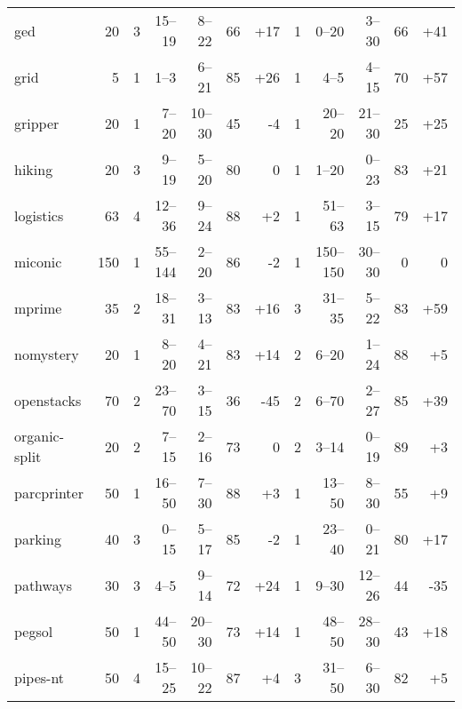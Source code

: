 \documentclass{article}
\begin{document}
\begin{table}
\begin{tabular}{l@{}rr|rrrr|r|rrrr}
           ged &     20 &   3 &   15--19 &   8--22 &  66 &  {\color{blue}+17} &   1 &     0--20 &   3--30 &  66 &  {\color{blue}+41} \\
          grid &      5 &   1 &     1--3 &   6--21 &  85 &  {\color{blue}+26} &   1 &      4--5 &   4--15 &  70 &  {\color{blue}+57} \\
       gripper &     20 &   1 &    7--20 &  10--30 &  45 &    {\color{red}-4} &   1 &    20--20 &  21--30 &  25 &  {\color{blue}+25} \\
        hiking &     20 &   3 &    9--19 &   5--20 &  80 &                  0 &   1 &     1--20 &   0--23 &  83 &  {\color{blue}+21} \\
     logistics &     63 &   4 &   12--36 &   9--24 &  88 &   {\color{blue}+2} &   1 &    51--63 &   3--15 &  79 &  {\color{blue}+17} \\
       miconic &    150 &   1 &  55--144 &   2--20 &  86 &    {\color{red}-2} &   1 &  150--150 &  30--30 &   0 &                  0 \\
        mprime &     35 &   2 &   18--31 &   3--13 &  83 &  {\color{blue}+16} &   3 &    31--35 &   5--22 &  83 &  {\color{blue}+59} \\
     nomystery &     20 &   1 &    8--20 &   4--21 &  83 &  {\color{blue}+14} &   2 &     6--20 &   1--24 &  88 &   {\color{blue}+5} \\
    openstacks &     70 &   2 &   23--70 &   3--15 &  36 &   {\color{red}-45} &   2 &     6--70 &   2--27 &  85 &  {\color{blue}+39} \\
 organic-split &     20 &   2 &    7--15 &   2--16 &  73 &                  0 &   2 &     3--14 &   0--19 &  89 &   {\color{blue}+3} \\
   parcprinter &     50 &   1 &   16--50 &   7--30 &  88 &   {\color{blue}+3} &   1 &    13--50 &   8--30 &  55 &   {\color{blue}+9} \\
       parking &     40 &   3 &    0--15 &   5--17 &  85 &    {\color{red}-2} &   1 &    23--40 &   0--21 &  80 &  {\color{blue}+17} \\
      pathways &     30 &   3 &     4--5 &   9--14 &  72 &  {\color{blue}+24} &   1 &     9--30 &  12--26 &  44 &   {\color{red}-35} \\
        pegsol &     50 &   1 &   44--50 &  20--30 &  73 &  {\color{blue}+14} &   1 &    48--50 &  28--30 &  43 &  {\color{blue}+18} \\
      pipes-nt &     50 &   4 &   15--25 &  10--22 &  87 &   {\color{blue}+4} &   3 &    31--50 &   6--30 &  82 &   {\color{blue}+5} \\

\end{tabular}
\end{table}
\end{document}
